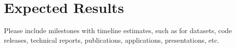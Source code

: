 \section{Expected Results}

Please include milestones with timeline estimates, such as for datasets, code
releases, technical reports, publications, applications, presentations, etc.
